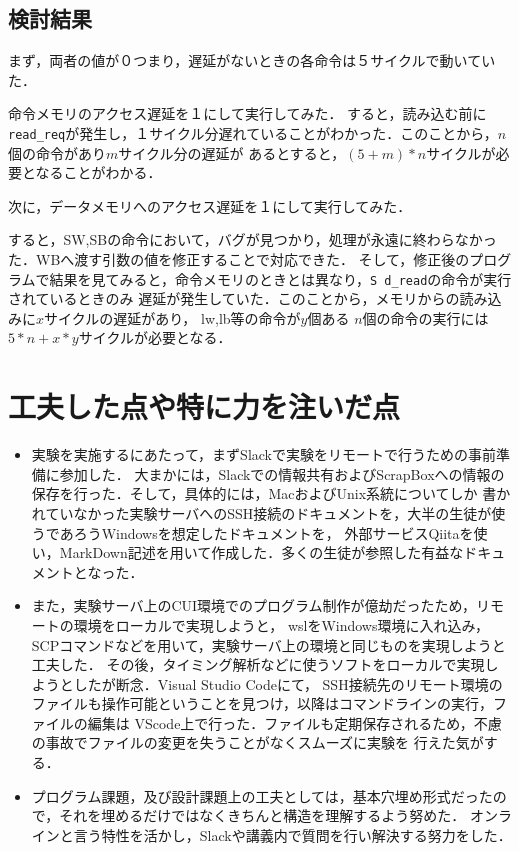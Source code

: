 \documentclass{jarticle}[11pt]
\begin{document}
  \subsection{検討結果}\label{検討結果}

  まず，両者の値が０つまり，遅延がないときの各命令は５サイクルで動いていた．
  
  命令メモリのアクセス遅延を１にして実行してみた．
  すると，読み込む前に\verb|read_req|が発生し，１サイクル分遅れていることがわかった．このことから，$n$個の命令があり$m$サイクル分の遅延が
  あるとすると，$(5+m)*n$サイクルが必要となることがわかる．

  次に，データメモリへのアクセス遅延を１にして実行してみた．

  すると，SW,SBの命令において，バグが見つかり，処理が永遠に終わらなかった．WBへ渡す引数の値を修正することで対応できた．
  そして，修正後のプログラムで結果を見てみると，命令メモリのときとは異なり，\verb|S d_read|の命令が実行されているときのみ
  遅延が発生していた．このことから，メモリからの読み込みに$x$サイクルの遅延があり，
  lw,lb等の命令が$y$個ある $n$個の命令の実行には$5*n+x*y$サイクルが必要となる．

  \section{工夫した点や特に力を注いだ点}\label{sec:工夫した点や特に力を注いだ点}

  \begin{itemize}
    \item 実験を実施するにあたって，まずSlackで実験をリモートで行うための事前準備に参加した．
  大まかには，Slackでの情報共有およびScrapBoxへの情報の保存を行った．そして，具体的には，MacおよびUnix系統についてしか
  書かれていなかった実験サーバへのSSH接続のドキュメントを，大半の生徒が使うであろうWindowsを想定したドキュメントを，
  外部サービスQiitaを使い，MarkDown記述を用いて作成した．多くの生徒が参照した有益なドキュメントとなった．
    \item また，実験サーバ上のCUI環境でのプログラム制作が億劫だったため，リモートの環境をローカルで実現しようと，
  wslをWindows環境に入れ込み，SCPコマンドなどを用いて，実験サーバ上の環境と同じものを実現しようと工夫した．
  その後，タイミング解析などに使うソフトをローカルで実現しようとしたが断念．Visual Studio Codeにて，
  SSH接続先のリモート環境のファイルも操作可能ということを見つけ，以降はコマンドラインの実行，ファイルの編集は
  VScode上で行った．ファイルも定期保存されるため，不慮の事故でファイルの変更を失うことがなくスムーズに実験を
  行えた気がする．
    \item プログラム課題，及び設計課題上の工夫としては，基本穴埋め形式だったので，それを埋めるだけではなくきちんと構造を理解するよう努めた．
  オンラインと言う特性を活かし，Slackや講義内で質問を行い解決する努力をした．
  \end{itemize}
  
\end{document}
